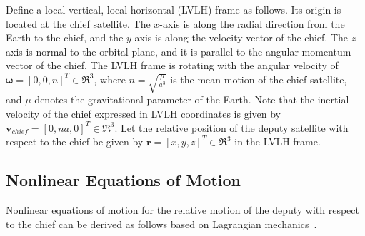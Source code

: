 Define a local-vertical, local-horizontal (LVLH) frame as follows. Its origin is located at the chief satellite. The $x$-axis is along the radial direction from the Earth to the chief, and the $y$-axis is along the velocity vector of the chief. The $z$-axis is normal to the orbital plane, and it is parallel to the angular momentum vector of the chief. The LVLH frame is rotating with the angular velocity of $\mathbf{\omega}=[0,0,n]^T\in\Re^3$, where $n=\sqrt{\frac{\mu}{a^3}}$ is the mean motion of the chief satellite, and $\mu$ denotes the gravitational parameter of the Earth. Note that the inertial velocity of the chief expressed in LVLH coordinates is given by $\mathbf{v}_{chief}=[0,na,0]^T\in\Re^3$. Let the relative position of the deputy satellite with respect to the chief be given by $\mathbf{r}=[x,y,z]^T\in\Re^3$ in the LVLH frame. 

\subsection{Nonlinear Equations of Motion}

Nonlinear equations of motion for the relative motion of the deputy with respect to the chief can be derived as follows based on Lagrangian mechanics~\cite{LovLeePISSFD14}. 

